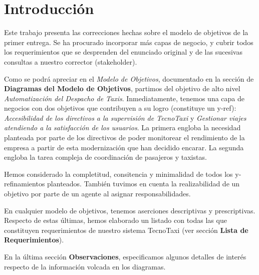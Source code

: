 \section{Introducción}

Este trabajo presenta las correcciones hechas sobre el modelo de objetivos de la primer entrega. Se ha procurado incorporar más capas de negocio, y cubrir todos los requerimientos que se desprenden del enunciado original y de las sucesivas consultas a nuestro corrector (stakeholder).
\par
Como se podrá apreciar en el \emph{Modelo de Objetivos}, documentado en la sección de \textbf{Diagramas del Modelo de Objetivos}, partimos del objetivo de alto nivel \emph{Automatización del Despacho de Taxis}. Inmediatamente, tenemos una capa de negocios con dos objetivos que contribuyen a su logro (constituye un y-ref): \emph{Accesibilidad de los directivos a la supervisión de TecnoTaxi} y \emph{Gestionar viajes atendiendo a la satisfacción de los usuarios}. La primera engloba la necesidad planteada por parte de los directivos de poder monitorear el rendimiento de la empresa a partir de esta modernización que han decidido encarar. La segunda engloba la tarea compleja de coordinación de pasajeros y taxistas.
\par
Hemos considerado la completitud, consitencia y minimalidad de todos los y-refinamientos planteados. También tuvimos en cuenta la realizabilidad de un objetivo por parte de un agente al asignar responsabilidades.
\par
En cualquier modelo de objetivos, tenemos aserciones descriptivas y prescriptivas. Respecto de estas últimas, hemos elaborado un listado con todas las que constituyen requerimientos de nuestro sistema TecnoTaxi (ver sección \textbf{Lista de Requerimientos}).
\par
En la última sección \textbf{Observaciones}, especificamos algunos detalles de interés respecto de la información volcada en los diagramas.


